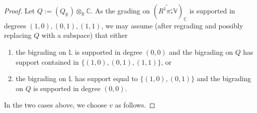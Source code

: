 \documentclass[12 pt]{amsart}
\theoremstyle{plain}
\theoremstyle{definition}
\theoremstyle{remark}
\numberwithin{equation}{section}
\DeclareMathOperator\rk{rk}
\DeclareMathOperator\Hom{Hom}
\begin{document}
\begin{proof}

Let $Q := (Q_\mathbb R) \otimes_{\mathbb R} \mathbb C$.
As the grading on $(\widetilde{R^1 \pi^\circ_* \mathbb V})_{\mathbb C}$ is supported in degrees $(1,0), (0,1), (1,1)$, we may assume (after regrading and possibly replacing $Q$ with a subspace) that either
\begin{enumerate}
\item the bigrading on $\mathbb{L}$ is supported in degree $(0,0)$ and the bigrading on $Q$ has support contained in  $\{(1,0), (0,1), (1,1)\}$, or
\item the bigrading on $\mathbb{L}$ has support equal to $\{(1,0),(0,1)\}$
	and the bigrading on $Q$ is supported in degree $(0,0)$.
\end{enumerate}
In the two cases above, we choose $v$ as follows.


\end{proof}
\end{document}
